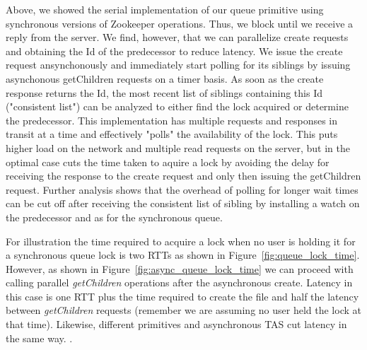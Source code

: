 Above, we showed the serial implementation of our queue primitive using synchronous versions of Zookeeper operations. Thus, we block until we receive a reply from the server. We find, however, that we can parallelize create requests and obtaining the Id of the predecessor to reduce latency. We issue the create request ansynchonously and immediately start polling for its siblings by issuing asynchonous getChildren requests on a timer basis. As soon as the create response returns the Id, the most recent list of siblings containing this Id ("consistent list") can be analyzed to either find the lock acquired or determine the predecessor. This implementation has multiple requests and responses in transit at a time and effectively "polls" the availability of the lock. This puts higher load on the network and multiple read requests on the server, but in the optimal case cuts the time taken to aquire a lock by avoiding the delay for receiving the response to the create request and only then issuing the getChildren request. Further analysis shows that the overhead of polling for longer wait times can be cut off after receiving the consistent list of sibling by installing a watch on the predecessor and as for the synchronous queue.

For illustration the time required to acquire a lock when no user is holding it for a synchronous queue lock is two RTTs as shown in Figure~\ref{fig:queue_lock_time}. However, as shown in Figure~\ref{fig:async_queue_lock_time} we can proceed with calling parallel \emph{getChildren} operations after the asynchronous create. Latency in this case is one RTT plus the time required to create the file and half the latency between \emph{getChildren} requests (remember we are assuming no user held the lock at that time). Likewise, different primitives and asynchronous TAS cut latency in the same way. .

